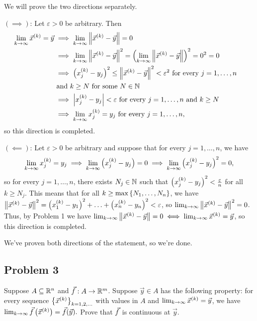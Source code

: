 \documentclass[main.tex]{subfiles}
\begin{document}
\begin{soln}
    We will prove the two directions separately.

    $(\implies)$: Let $\varepsilon > 0$ be arbitrary. Then 
    \begin{align*}
        \lim_{k\to \infty} \vec{x}^{(k)} = \vec{y}&\implies \lim_{k\to \infty} \left\lVert \vec{x}^{(k)} - \vec{y} \right\rVert = 0& \\
        &\implies \lim_{k\to \infty}\left\lVert \vec{x}^{(k)} - \vec{y} \right\rVert^2 = \left( \lim_{k\to \infty}\left\lVert \vec{x}^{(k)} - \vec{y} \right\rVert \right)^2 = 0^2 = 0\\
        &\implies \left( x ^{(k)}_j - y_j \right)^2 \le \left\lVert \vec{x}^{(k)} - \vec{y} \right\rVert^2 < \varepsilon^2 \text{ for every }j = 1,\ldots ,n\\
        &\text{ and }k \ge N\text{ for some }N\in \mathbb N \\
        &\implies \left\lvert x ^{(k)}_j - y_j \right\rvert < \varepsilon \text{ for every }j = 1,\ldots ,n\text{ and }k \ge N \\
        &\implies \lim_{k\to \infty} x ^{(k)}_j = y_j\text{ for every }j = 1,\ldots ,n,
    \end{align*}
    so this direction is completed.

    $(\impliedby)$: Let $\varepsilon > 0$ be arbitrary and suppose that for every $j = 1,\ldots ,n$, we have
    \[\lim_{k\to \infty} x ^{(k)}_j = y_j\implies \lim_{k\to \infty} \left( x ^{(k)}_j - y_j \right) = 0\implies \lim_{k\to \infty} \left( x ^{(k)}_j - y_j \right)^2 = 0,\]
    so for every $j = 1, \ldots , n$, there exists $N_j\in \mathbb N$ such that $\left( x ^{(k)}_j - y_j \right)^2 < \frac{\varepsilon}{n}$ for all $k\ge N_j$. This means that for all $k \ge \max\left\{ N_1, \ldots , N_n \right\}$, we have $\left\lVert \vec{x}^{(k)} - \vec{y} \right\rVert^2 = \left( x ^{(k)}_1 - y_1 \right)^2 + \ldots + \left( x ^{(k)}_n - y_n \right)^2 < \varepsilon$, so $\lim_{k\to \infty}\left\lVert \vec{x}^{(k)} - \vec{y} \right\rVert^2 = 0$. Thus, by Problem 1 we have $\lim_{k\to \infty}\left\lVert \vec{x}^{(k)} - \vec{y} \right\rVert = 0\iff \lim_{k\to \infty} \vec{x}^{(k)} = \vec{y}$, so this direction is completed.

    We've proven both directions of the statement, so we're done.
\end{soln}
\eject

\subsection{Problem 3}
\begin{claim}
    Suppose $A \subseteq \mathbb R^n$ and $\vec{f} : A \to \mathbb R^m$. Suppose $\vec{y} \in A$ has the following property: for every sequence $\left\{ \vec{x}^{(k)} \right\}_{k=1,2,\ldots}$ with values in $A$ and $\lim_{k\to \infty} \vec{x}^{(k)} = \vec{y}$, we have $\lim_{k\to \infty} \vec{f}\left( \vec{x}^{(k)} \right) = \vec{f}(\vec{y}).$ Prove that $\vec{f}$ is continuous at $\vec{y}$.
\end{claim}
\end{document}

